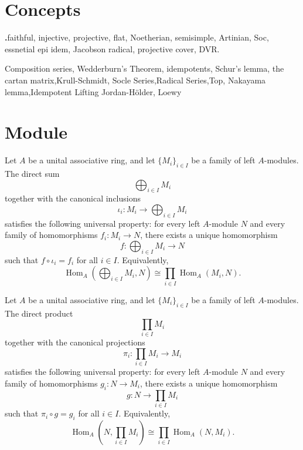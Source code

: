 
\newcommand{\np}{\noindent\textbf{.}\quad}

\section{Concepts}

\np faithful, injective, projective, flat, Noetherian, semisimple, Artinian, Soc, essnetial epi
idem, Jacobson radical, projective cover, DVR.

Composition series, Wedderburn’s Theorem, idempotents, Schur's lemma, the cartan matrix,Krull-Schmidt, Socle Series,Radical Series,Top, Nakayama lemma,Idempotent Lifting
Jordan-Hölder, Loewy 

\section{Module}

\begin{theorem} \label{thm:universal-property-direct-sum} 
    Let \(A\) be a unital associative ring, and let \(\{M_i\}_{i\in I}\) be a family of left \(A\)-modules. The direct sum \[ \bigoplus_{i\in I} M_i \] together with the canonical inclusions \[ \iota_i:M_i\longrightarrow \bigoplus_{i\in I}M_i \] satisfies the following universal property: for every left \(A\)-module \(N\) and every family of homomorphisms \(f_i:M_i\to N\), there exists a unique homomorphism \[ f:\bigoplus_{i\in I}M_i\longrightarrow N \] such that \(f\circ \iota_i=f_i\) for all \(i\in I\). Equivalently, \[ \operatorname{Hom}_A\left(\bigoplus_{i\in I}M_i,N\right) \cong \prod_{i\in I}\operatorname{Hom}_A(M_i,N). \] 
\end{theorem} 
    
\begin{theorem} \label{thm:universal-property-direct-product} 
    Let \(A\) be a unital associative ring, and let \(\{M_i\}_{i\in I}\) be a family of left \(A\)-modules. The direct product \[ \prod_{i\in I} M_i \] together with the canonical projections \[ \pi_i:\prod_{i\in I}M_i\longrightarrow M_i \] satisfies the following universal property: for every left \(A\)-module \(N\) and every family of homomorphisms \(g_i:N\to M_i\), there exists a unique homomorphism \[ g:N\longrightarrow \prod_{i\in I}M_i \] such that \(\pi_i\circ g=g_i\) for all \(i\in I\). Equivalently, \[ \operatorname{Hom}_A\left(N,\prod_{i\in I}M_i\right) \cong \prod_{i\in I}\operatorname{Hom}_A(N,M_i). \] 
\end{theorem}


